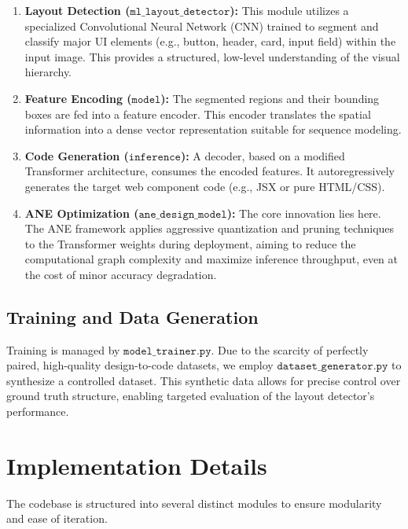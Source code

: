 \documentclass[11pt,a4paper]{article}
\begin{document}
\begin{enumerate}
    \item \textbf{Layout Detection ($\texttt{ml\_layout\_detector}$):} This module utilizes a specialized Convolutional Neural Network (CNN) trained to segment and classify major UI elements (e.g., button, header, card, input field) within the input image. This provides a structured, low-level understanding of the visual hierarchy.
    \item \textbf{Feature Encoding ($\texttt{model}$):} The segmented regions and their bounding boxes are fed into a feature encoder. This encoder translates the spatial information into a dense vector representation suitable for sequence modeling.
    \item \textbf{Code Generation ($\texttt{inference}$):} A decoder, based on a modified Transformer architecture, consumes the encoded features. It autoregressively generates the target web component code (e.g., JSX or pure HTML/CSS).
    \item \textbf{ANE Optimization ($\texttt{ane\_design\_model}$):} The core innovation lies here. The ANE framework applies aggressive quantization and pruning techniques to the Transformer weights during deployment, aiming to reduce the computational graph complexity and maximize inference throughput, even at the cost of minor accuracy degradation.
\end{enumerate}

\subsection{Training and Data Generation}
Training is managed by $\texttt{model\_trainer.py}$. Due to the scarcity of perfectly paired, high-quality design-to-code datasets, we employ $\texttt{dataset\_generator.py}$ to synthesize a controlled dataset. This synthetic data allows for precise control over ground truth structure, enabling targeted evaluation of the layout detector's performance.

\section{Implementation Details}
The codebase is structured into several distinct modules to ensure modularity and ease of iteration.
\end{document}
